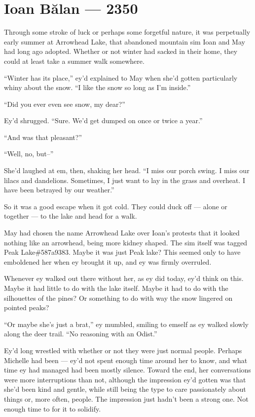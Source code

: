 \hypertarget{ioan-bux103lan-2350}{%
\chapter{Ioan Bălan — 2350}\label{ioan-bux103lan-2350}}

Through some stroke of luck or perhaps some forgetful nature, it was perpetually early summer at Arrowhead Lake, that abandoned mountain sim Ioan and May had long ago adopted. Whether or not winter had sacked in their home, they could at least take a summer walk somewhere.

``Winter has its place,'' ey'd explained to May when she'd gotten particularly whiny about the snow. ``I like the snow so long as I'm inside.''

``Did you ever even see snow, my dear?''

Ey'd shrugged. ``Sure. We'd get dumped on once or twice a year.''

``And was that pleasant?''

``Well, no, but--''

She'd laughed at em, then, shaking her head. ``I miss our porch swing. I miss our lilacs and dandelions. Sometimes, I just want to lay in the grass and overheat. I have been betrayed by our weather.''

So it was a good escape when it got cold. They could duck off — alone or together — to the lake and head for a walk.

May had chosen the name Arrowhead Lake over Ioan's protests that it looked nothing like an arrowhead, being more kidney shaped. The sim itself was tagged Peak Lake\#587a9383. Maybe it was just Peak lake? This seemed only to have emboldened her when ey brought it up, and ey was firmly overruled.

Whenever ey walked out there without her, as ey did today, ey'd think on this. Maybe it had little to do with the lake itself. Maybe it had to do with the silhouettes of the pines? Or something to do with way the snow lingered on pointed peaks?

``Or maybe she's just a brat,'' ey mumbled, smiling to emself as ey walked slowly along the deer trail. ``No reasoning with an Odist.''

Ey'd long wrestled with whether or not they were just normal people. Perhaps Michelle had been — ey'd not spent enough time around her to know, and what time ey had managed had been mostly silence. Toward the end, her conversations were more interruptions than not, although the impression ey'd gotten was that she'd been kind and gentle, while still being the type to care passionately about things or, more often, people. The impression just hadn't been a strong one. Not enough time to for it to solidify.

